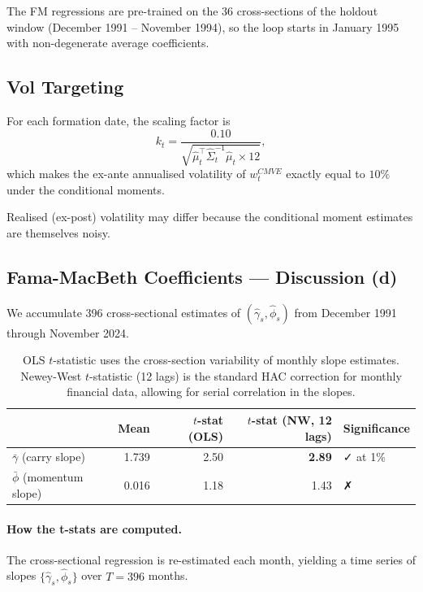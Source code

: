 \documentclass[a4paper,12pt]{article}
\begin{document}
The FM regressions are pre-trained on the 36 cross-sections of the holdout window
(December 1991 -- November 1994), so the loop starts in January 1995 with non-degenerate
average coefficients.

\subsection{Vol Targeting}

For each formation date, the scaling factor is
\begin{equation}
    k_t = \frac{0.10}{\sqrt{\hat{\mu}_t^{\top} \hat{\Sigma}_t^{-1} \hat{\mu}_t \times 12}},
\end{equation}
which makes the ex-ante annualised volatility of $w^{CMVE}_t$ exactly equal to $10\%$
under the conditional moments.

Realised (ex-post) volatility may differ because the conditional moment estimates are
themselves noisy.

\subsection{Fama-MacBeth Coefficients --- Discussion (d)}

We accumulate 396 cross-sectional estimates of $(\hat{\gamma}_s, \hat{\phi}_s)$ from
December 1991 through November 2024.

\begin{table}[H]
\centering
\caption{Fama-MacBeth Coefficient Summary (1991--2024, 396 cross-sections)}
\label{tab:fmcoef}
\renewcommand{\arraystretch}{1.3}
\begin{tabular}{lrrrl}
\toprule
 & \textbf{Mean} & $t$-stat (OLS) & $t$-stat (NW, 12 lags) & Significance \\
\midrule
$\bar{\gamma}$ (carry slope)    & 1.739 & 2.50 & \textbf{2.89} & ✓ at 1\% \\
$\bar{\phi}$ (momentum slope)   & 0.016 & 1.18 & 1.43          & ✗ \\
\bottomrule
\end{tabular}
\caption*{\footnotesize OLS $t$-statistic uses the cross-section variability of monthly
slope estimates. Newey-West $t$-statistic (12 lags) is the standard HAC correction for
monthly financial data, allowing for serial correlation in the slopes.}
\end{table}

\paragraph{How the t-stats are computed.}
The cross-sectional regression is re-estimated each month, yielding a time series of slopes
$\{\hat{\gamma}_s, \hat{\phi}_s\}$ over $T = 396$ months.
\end{document}
